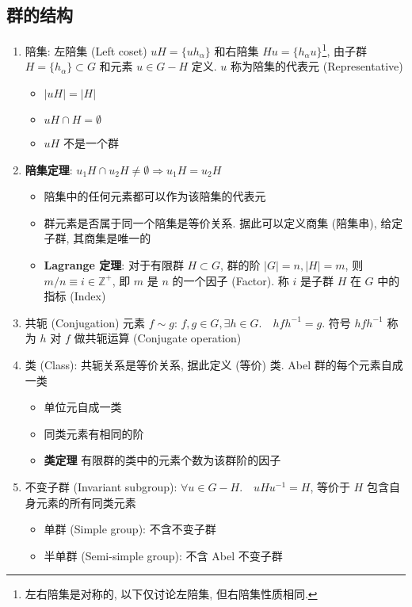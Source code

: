 \documentclass[12pt,a4paper]{article}%
\numberwithin{equation}{section}%
\begin{document}
\subsection{群的结构} %
\label{sub:struct}
\begin{enumerate}
	\item 陪集: 左陪集 (Left coset) $uH = \{uh_\alpha\}$ 和右陪集 $Hu = \{h_\alpha u\}$\footnote{左右陪集是对称的, 以下仅讨论左陪集, 但右陪集性质相同.}, 由子群 $H = \{h_\alpha\}\subset G$ 和元素 $u\in G-H$ 定义. $u$ 称为陪集的代表元 (Representative)
	\begin{itemize}
		\item $|uH| = |H|$
		\item $uH\cap H = \emptyset$
		\item $uH$ 不是一个群
	\end{itemize}
	\item \textbf{陪集定理}: $u_1 H\cap u_2 H\neq\emptyset\Longrightarrow u_1 H = u_2 H$
	\begin{itemize}
		\item 陪集中的任何元素都可以作为该陪集的代表元
		\item 群元素是否属于同一个陪集是等价关系. 据此可以定义商集 (陪集串), 给定子群, 其商集是唯一的
		\item \textbf{Lagrange 定理}: 对于有限群 $H\subset G$, 群的阶 $|G| = n, |H| = m$, 则 $m/n\equiv i\in\mathbb Z^+$, 即 $m$ 是 $n$ 的一个因子 (Factor). 称 $i$ 是子群 $H$ 在 $G$ 中的指标 (Index)
	\end{itemize}
	\item 共轭 (Conjugation) 元素 $f\sim g$: $f,g\in G, \exists h\in G.\quad hfh^{-1} = g$. 
	符号 $ hfh^{-1}$ 称为 $h$ 对 $f$ 做共轭运算 (Conjugate operation)
	\item 类 (Class): 共轭关系是等价关系, 据此定义 (等价) 类. Abel 群的每个元素自成一类
	\begin{itemize}
		\item 单位元自成一类
		\item 同类元素有相同的阶
		\item \textbf{类定理} 有限群的类中的元素个数为该群阶的因子
	\end{itemize}
	\item 不变子群 (Invariant subgroup): $\forall u\in G- H.\quad uHu^{-1} = H$, 
	等价于 $H$ 包含自身元素的所有同类元素
	\begin{itemize}
		\item 单群 (Simple group): 不含不变子群
		\item 半单群 (Semi-simple group): 不含 Abel 不变子群

\end{itemize}
\end{enumerate}
\end{document}
